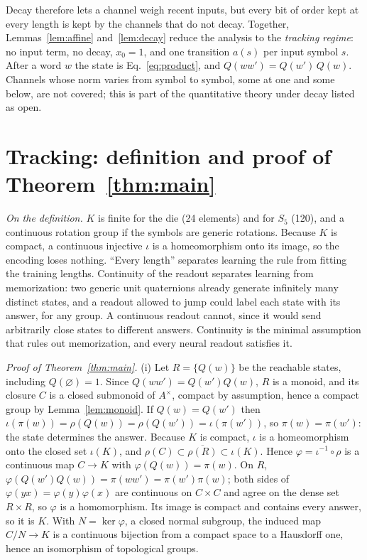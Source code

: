 \documentclass[aps,prx,reprint,superscriptaddress,longbibliography,nofootinbib,floatfix]{revtex4-2}
\theoremstyle{plain}
\theoremstyle{definition}
\begin{document}
Decay therefore lets a channel weigh recent inputs, but every bit of order
kept at every length is kept by the channels that do not decay. Together,
Lemmas~\ref{lem:affine} and~\ref{lem:decay} reduce the analysis to the
\emph{tracking regime}: no input term, no decay, $x_0=1$, and one transition
$a(s)$ per input symbol $s$. After a word $w$ the state is
Eq.~\eqref{eq:product}, and $Q(ww')=Q(w')\,Q(w)$. Channels whose norm varies
from symbol to symbol, some at one and some below, are not covered; this is
part of the quantitative theory under decay listed as open.

\section{Tracking: definition and proof of Theorem~\ref{thm:main}}\label{sm:tracking}

\emph{On the definition.} $K$ is finite for the die (24 elements) and for
$S_5$ (120), and a continuous rotation group if the symbols are generic
rotations. Because $K$ is compact, a continuous injective $\iota$ is a
homeomorphism onto its image, so the encoding loses nothing. ``Every
length'' separates learning the rule from fitting the training lengths.
Continuity of the readout separates learning from memorization: two generic
unit quaternions already generate infinitely many distinct states, and a
readout allowed to jump could label each state with its answer, for any
group. A continuous readout cannot, since it would send arbitrarily close
states to different answers. Continuity is the minimal assumption that rules
out memorization, and every neural readout satisfies it.

\emph{Proof of Theorem~\ref{thm:main}.} (i) Let $R=\{Q(w)\}$ be the
reachable states, including $Q(\varnothing)=1$. Since
$Q(ww')=Q(w')Q(w)$, $R$ is a monoid, and its closure $C$ is a closed
submonoid of $A^\times$, compact by assumption, hence a compact group by
Lemma~\ref{lem:monoid}. If $Q(w)=Q(w')$ then
$\iota(\pi(w))=\rho(Q(w))=\rho(Q(w'))=\iota(\pi(w'))$, so $\pi(w)=\pi(w')$:
the state determines the answer. Because $K$ is compact, $\iota$ is a
homeomorphism onto the closed set $\iota(K)$, and $\rho(C)\subset
\overline{\rho(R)}\subset\iota(K)$. Hence $\varphi=\iota^{-1}\circ\rho$ is a
continuous map $C\to K$ with $\varphi(Q(w))=\pi(w)$. On $R$,
$\varphi(Q(w')Q(w))=\pi(ww')=\pi(w')\pi(w)$; both sides of
$\varphi(yx)=\varphi(y)\varphi(x)$ are continuous on $C\times C$ and agree
on the dense set $R\times R$, so $\varphi$ is a homomorphism. Its image is
compact and contains every answer, so it is $K$. With $N=\ker\varphi$, a
closed normal subgroup, the induced map $C/N\to K$ is a continuous
bijection from a compact space to a Hausdorff one, hence an isomorphism of
topological groups.
\end{document}
